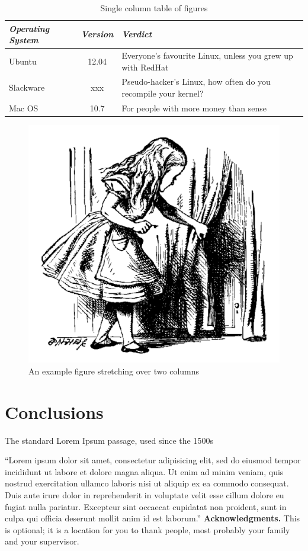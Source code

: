 \documentclass{mpaper}
\begin{document}
\begin{table}
\begin{tabular}{l||c||p{2cm}}
\emph{Operating System} & \emph{Version} & \emph{Verdict} \\ \hline \hline
Ubuntu & 12.04 & Everyone's favourite Linux, unless you grew up with
RedHat \\ \hline
Slackware & xxx & Pseudo-hacker's Linux, how often do you recompile
your kernel? \\ \hline
Mac OS & 10.7 & For people with more money than sense \\ \hline
\end{tabular}
\caption{\label{tab-eg}Single column table of figures}
\end{table}

\begin{figure}
\begin{center}
\includegraphics[scale=0.3]{alice.pdf}
\end{center}
\caption{\label{fig-eg}An example figure stretching over two columns}
\end{figure}

\section{Conclusions}

The standard Lorem Ipsum passage, used since the 1500s

``Lorem ipsum dolor sit amet, consectetur adipisicing elit, sed do eiusmod tempor incididunt ut labore et dolore magna aliqua. Ut enim ad minim veniam, quis nostrud exercitation ullamco laboris nisi ut aliquip ex ea commodo consequat. Duis aute irure dolor in reprehenderit in voluptate velit esse cillum dolore eu fugiat nulla pariatur. Excepteur sint occaecat cupidatat non proident, sunt in culpa qui officia deserunt mollit anim id est laborum.''
\vskip8pt \noindent
{\bf Acknowledgments.}
This is optional; it is a location for you to thank people, most probably your family and your supervisor.



\end{document}

